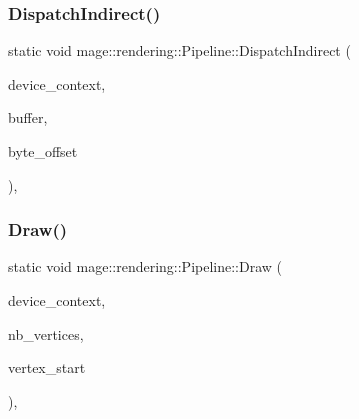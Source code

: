 \hypertarget{structmage_1_1rendering_1_1_pipeline_aceae5a9f2d24336e4424208a8e037a82}{}\label{structmage_1_1rendering_1_1_pipeline_aceae5a9f2d24336e4424208a8e037a82} 
\subsubsection{\texorpdfstring{Dispatch\+Indirect()}{DispatchIndirect()}}
{\footnotesize\ttfamily static void mage\+::rendering\+::\+Pipeline\+::\+Dispatch\+Indirect (\begin{DoxyParamCaption}\item[{I\+D3\+D11\+Device\+Context \&}]{device\+\_\+context,  }\item[{I\+D3\+D11\+Buffer \&}]{buffer,  }\item[{\hyperlink{namespacemage_a41c104c036fba3756a74e19f793eeaa1}{U32}}]{byte\+\_\+offset }\end{DoxyParamCaption})\hspace{0.3cm}{\ttfamily [static]}, {\ttfamily [noexcept]}}

\hypertarget{structmage_1_1rendering_1_1_pipeline_acc764fee84589a85e0e2df129b34b137}{}\label{structmage_1_1rendering_1_1_pipeline_acc764fee84589a85e0e2df129b34b137} 
\subsubsection{\texorpdfstring{Draw()}{Draw()}}
{\footnotesize\ttfamily static void mage\+::rendering\+::\+Pipeline\+::\+Draw (\begin{DoxyParamCaption}\item[{I\+D3\+D11\+Device\+Context \&}]{device\+\_\+context,  }\item[{\hyperlink{namespacemage_a41c104c036fba3756a74e19f793eeaa1}{U32}}]{nb\+\_\+vertices,  }\item[{\hyperlink{namespacemage_a41c104c036fba3756a74e19f793eeaa1}{U32}}]{vertex\+\_\+start }\end{DoxyParamCaption})\hspace{0.3cm}{\ttfamily [static]}, {\ttfamily [noexcept]}}

\hypertarget{structmage_1_1rendering_1_1_pipeline_a30cdc51051e3fcab0d3a9c36efad40e4}{}\label{structmage_1_1rendering_1_1_pipeline_a30cdc51051e3fcab0d3a9c36efad40e4} 
